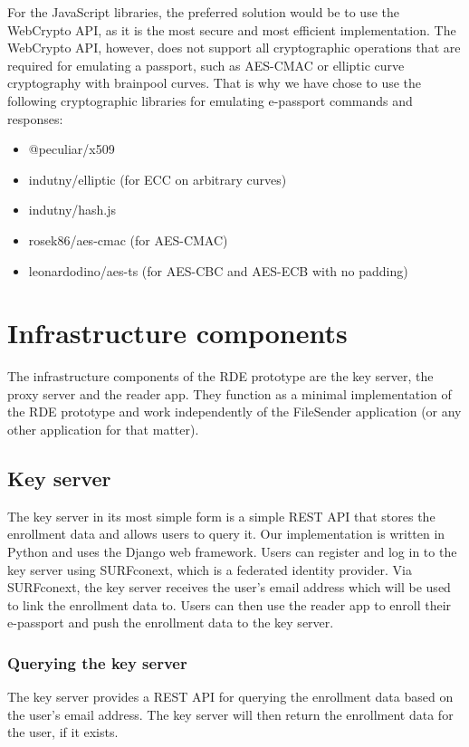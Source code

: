 For the JavaScript libraries, the preferred solution would be to use the WebCrypto API, as it is the most secure and most efficient implementation.
The WebCrypto API, however, does not support all cryptographic operations that are required for emulating a passport, such as AES-CMAC or elliptic curve cryptography with brainpool curves.
That is why we have chose to use the following cryptographic libraries for emulating e-passport commands and responses:

\begin{itemize}
    \item \textsf{@peculiar/x509}
    \item \textsf{indutny/elliptic} (for ECC on arbitrary curves)
    \item \textsf{indutny/hash.js}
    \item \textsf{rosek86/aes-cmac} (for AES-CMAC)
    \item \textsf{leonardodino/aes-ts} (for AES-CBC and AES-ECB with no padding)
\end{itemize}

\section{Infrastructure components}\label{sec:infrastructure-components}
The infrastructure components of the RDE prototype are the key server, the proxy server and the reader app.
They function as a minimal implementation of the RDE prototype and work independently of the FileSender application (or any other application for that matter).

\subsection{Key server}\label{subsec:key-server}
The key server in its most simple form is a simple REST API that stores the enrollment data and allows users to query it.
Our implementation is written in Python and uses the Django web framework.
Users can register and log in to the key server using SURFconext, which is a federated identity provider.
Via SURFconext, the key server receives the user's email address which will be used to link the enrollment data to.
Users can then use the reader app to enroll their e-passport and push the enrollment data to the key server.

\subsubsection{Querying the key server}\label{subsubsec:querying-the-key-server}
The key server provides a REST API for querying the enrollment data based on the user's email address.
The key server will then return the enrollment data for the user, if it exists.

